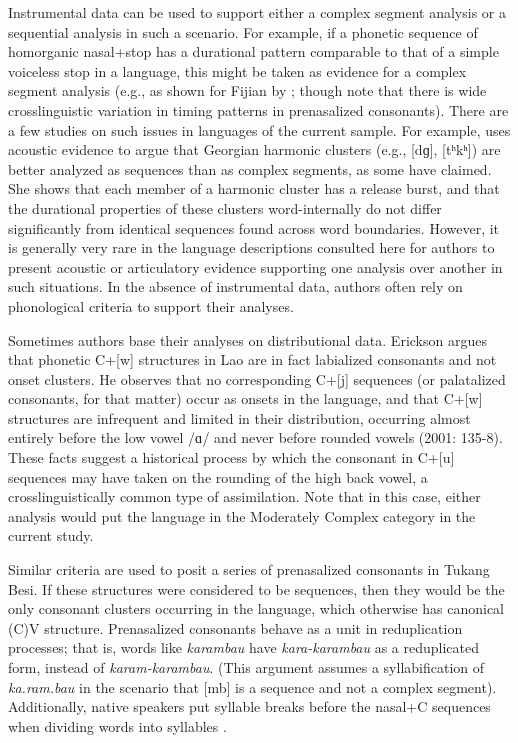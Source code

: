   Instrumental data can be used to support either a complex segment analysis or a sequential analysis in such a scenario. For example, if a phonetic sequence of homorganic nasal+stop has a durational pattern comparable to that of a simple voiceless stop in a language, this might be taken as evidence for a complex segment analysis (e.g., as shown for Fijian by \citealt{Maddieson1989a}; though \citealt{LadefogedMaddieson1996} note that there is wide crosslinguistic variation in timing patterns in prenasalized consonants). There are a few studies on such issues in languages of the current sample. For example, \citet{Chitoran1998} uses acoustic evidence to argue that Georgian harmonic clusters (e.g., [dɡ], [tʰkʰ]) are better analyzed as sequences than as complex segments, as some have claimed. She shows that each member of a harmonic cluster has a release burst, and that the durational properties of these clusters word-internally do not differ significantly from identical sequences found across word boundaries. However, it is generally very rare in the language descriptions consulted here for authors to present acoustic or articulatory evidence supporting one analysis over another in such situations. In the absence of instrumental data, authors often rely on phonological criteria to support their analyses.



  Sometimes authors base their analyses on distributional data. Erickson argues that phonetic C+[w] structures in Lao are in fact labialized consonants and not onset clusters. He observes that no corresponding C+[j] sequences (or palatalized consonants, for that matter) occur as onsets in the language, and that C+[w] structures are infrequent and limited in their distribution, occurring almost entirely before the low vowel /ɑ/ and never before rounded vowels (2001: 135-8). These facts suggest a historical process by which the consonant in C+[u] sequences may have taken on the rounding of the high back vowel, a crosslinguistically common type of assimilation. Note that in this case, either analysis would put the language in the Moderately Complex category in the current study.



  Similar criteria are used to posit a series of prenasalized consonants in Tukang Besi. If these structures were considered to be sequences, then they would be the only consonant clusters occurring in the language, which otherwise has canonical (C)V structure. Prenasalized consonants behave as a unit in reduplication processes; that is, words like \textit{karambau} have \textit{kara-karambau} as a reduplicated form, instead of \textit{karam-karambau}. (This argument assumes a syllabification of \textit{ka.ram.bau} in the scenario that [mb] is a sequence and not a complex segment). Additionally, native speakers put syllable breaks before the nasal+C sequences when dividing words into syllables \citep[30-31]{Donohue1999}. 



